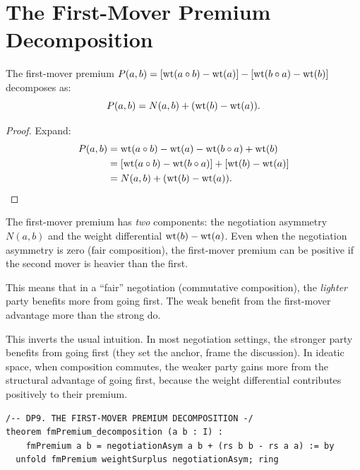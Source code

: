 \section{The First-Mover Premium Decomposition}

\begin{theorem}
\label{thm:first-mover}
The first-mover premium $P(a,b) = [\operatorname{wt}(a \circ b) - \operatorname{wt}(a)] - [\operatorname{wt}(b \circ a) - \operatorname{wt}(b)]$ decomposes as:
\[
P(a,b) = N(a,b) + (\operatorname{wt}(b) - \operatorname{wt}(a)).
\]
\end{theorem}

\begin{proof}
Expand:
\begin{align*}
P(a,b) &= \operatorname{wt}(a \circ b) - \operatorname{wt}(a) - \operatorname{wt}(b \circ a) + \operatorname{wt}(b) \\
&= [\operatorname{wt}(a \circ b) - \operatorname{wt}(b \circ a)] + [\operatorname{wt}(b) - \operatorname{wt}(a)] \\
&= N(a,b) + (\operatorname{wt}(b) - \operatorname{wt}(a)).
\end{align*}
\end{proof}

\begin{paradox}
The first-mover premium has \emph{two} components: the negotiation asymmetry $N(a,b)$ and the weight differential $\operatorname{wt}(b) - \operatorname{wt}(a)$. Even when the negotiation asymmetry is zero (fair composition), the first-mover premium can be positive if the second mover is heavier than the first.

This means that in a ``fair'' negotiation (commutative composition), the \emph{lighter} party benefits more from going first. The weak benefit from the first-mover advantage more than the strong do.

This inverts the usual intuition. In most negotiation settings, the stronger party benefits from going first (they set the anchor, frame the discussion). In ideatic space, when composition commutes, the weaker party gains more from the structural advantage of going first, because the weight differential contributes positively to their premium.
\end{paradox}

\begin{lstlisting}
/-- DP9. THE FIRST-MOVER PREMIUM DECOMPOSITION -/
theorem fmPremium_decomposition (a b : I) :
    fmPremium a b = negotiationAsym a b + (rs b b - rs a a) := by
  unfold fmPremium weightSurplus negotiationAsym; ring
\end{lstlisting}


